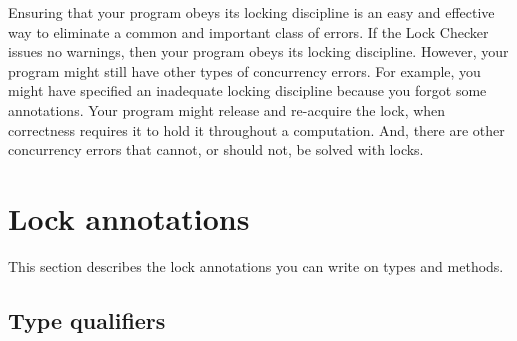 Ensuring that your program obeys its locking discipline is an easy and
effective way to eliminate a common and important class of errors.
If the Lock Checker issues no warnings, then your program obeys its locking discipline.
However, your program might still have other types of concurrency errors.
%
For example, you might have specified an inadequate locking discipline
because you forgot some 
annotations.
%
Your program might release and
re-acquire the lock, when correctness requires it to hold it throughout a
computation.
%
And, there are other concurrency errors that cannot, or
should not, be solved with locks.

\section{Lock annotations\label{lock-annotations}}

This section describes the lock annotations you can write on types and methods.


\subsection{Type qualifiers\label{lock-type-qualifiers}}

